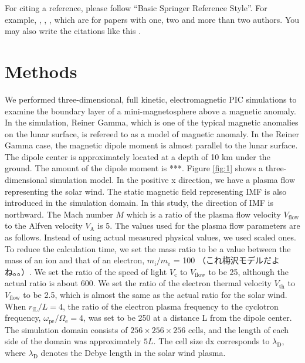 \documentclass{EPS}
\begin{document}
For citing a reference, please follow
``Basic Springer Reference Style''.
For example,
\cite{Miller2009}, \cite{MS2001}, \cite{Milleretal1999},
which are for papers with one, two and more than two authors.
You may also write the citations like this
\citep[e.g.][]{Miller1998a,Miller1998b,MS2001,Milleretal1999}.


\section{Methods}


We performed three-dimensional, full kinetic, electromagnetic PIC simulations to 
examine the boundary layer of a mini-magnetosphere above a magnetic anomaly. 
In the simulation, Reiner Gamma, which is one of the typical magnetic anomalies on the lunar surface, 
is refereed to as a model of magnetic anomaly. 
In the Reiner Gamma case, the magnetic dipole moment is almost parallel to the lunar surface. 
The dipole center is approximately located at a depth of 10 km under the ground. 
The amount of the dipole moment is ***.
Figure \ref{fig:1} shows a three-dimensional simulation model. In the positive x direction, 
we have a plasma flow representing the solar wind. 
The static magnetic field representing IMF is also introduced in the simulation domain. 
In this study, the direction of IMF is northward. 
The Mach number $M$ which is a ratio of the plasma flow velocity $V_\mathrm{flow}$ to the Alfven velocity $V_\mathrm{A}$ is 5. 
The values used for the plasma flow parameters are as follows. 
Instead of using actual measured physical values, we used scaled ones. 
To reduce the calculation time, we set the mass ratio to be a value between the mass of an ion and that of an electron, 
$ m_\mathrm{i}/ m_\mathrm{e}$ = 100 （これ梅沢モデルだよね。。）. 
We set the ratio of the speed of light $V_\mathrm{c}$ to $ V_\mathrm{flow}$ to be 25, although the actual ratio is about 600. 
We set the ratio of the electron thermal velocity $V_\mathrm{th}$ to $V_\mathrm{flow}$ to be 2.5, 
which is almost the same as the actual ratio for the solar wind. 
When $ r_\mathrm{iL} /L = 4$, the ratio of the electron plasma frequency to the cyclotron frequency, 
$\omega_\mathrm{pe} / \Omega_\mathrm{e} = 4$, was set to be 250 at a distance L from the dipole center. 
The simulation domain consists of $256 \times 256 \times 256$ cells, and the length of each side of 
the domain was approximately $5L$. 
The cell size dx corresponds to $\lambda_\mathrm{D}$, where $\lambda_\mathrm{D}$ 
denotes the Debye length in the solar wind plasma.
\end{document}
